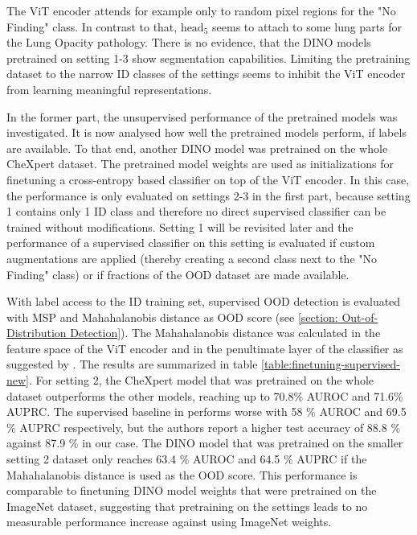 The ViT encoder attends for example only to random pixel regions for the "No Finding" class.
In contrast to that, $\text{head}_5$ seems to attach to some lung parts for the Lung Opacity pathology.
There is no evidence, that the DINO models pretrained on setting 1-3 show segmentation capabilities.
Limiting the pretraining dataset to the narrow ID classes of the settings seems to inhibit the ViT encoder from learning meaningful representations.
\par
In the former part, the unsupervised performance of the pretrained models was investigated.
It is now analysed how well the pretrained models perform, if labels are available.
To that end, another DINO model was pretrained on the whole CheXpert dataset.
The pretrained model weights are used as initializations for finetuning a cross-entropy based classifier on top of the ViT encoder.
In this case, the performance is only evaluated on settings 2-3 in the first part, because setting 1 contains only 1 ID class and therefore no direct supervised classifier can be trained without modifications.
Setting 1 will be revisited later and the performance of a supervised classifier on this setting is evaluated if custom augmentations are applied (thereby creating a second class next to the "No Finding" class) or if fractions of the OOD dataset are made available.
\par
With label access to the ID training set, supervised OOD detection is evaluated with MSP and Mahahalanobis distance as OOD score (see \ref{section: Out-of-Distribution Detection}).
The Mahahalanobis distance was calculated in the feature space of the ViT encoder and in the penultimate layer of the classifier as suggested by \citep{Lee2018, Michels2023}.
The results are summarized in table \ref{table:finetuning-supervised-new}.
For setting 2, the CheXpert model that was pretrained on the whole dataset outperforms the other models, reaching up to 70.8\% AUROC and 71.6\% AUPRC.
The supervised baseline in \citep{Berger2021} performs worse with 58 \% AUROC and 69.5 \% AUPRC respectively, but the authors report a higher test accuracy of 88.8 \% against 87.9 \% in our case.
The DINO model that was pretrained on the smaller setting 2 dataset only reaches 63.4 \% AUROC and 64.5 \% AUPRC if the Mahahalanobis distance is used as the OOD score.
This performance is comparable to finetuning DINO model weights that were pretrained on the ImageNet dataset, suggesting that pretraining on the settings leads to no measurable performance increase against using ImageNet weights.
